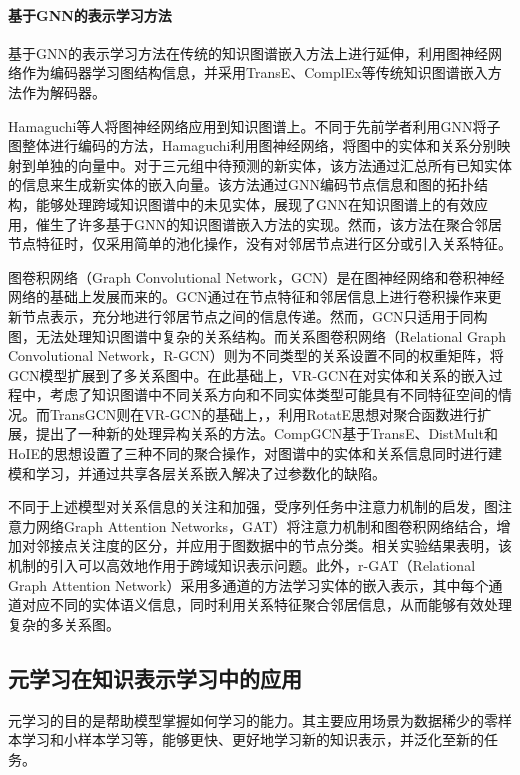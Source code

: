 \paragraph{基于GNN的表示学习方法}
基于GNN的表示学习方法在传统的知识图谱嵌入方法上进行延伸，利用图神经网络作为编码器学习图结构信息，并采用TransE、ComplEx等传统知识图谱嵌入方法作为解码器。

Hamaguchi\cite{hamaguchi2017knowledge}等人将图神经网络应用到知识图谱上。不同于先前学者利用GNN将子图整体进行编码的方法，Hamaguchi利用图神经网络，将图中的实体和关系分别映射到单独的向量中。对于三元组中待预测的新实体，该方法通过汇总所有已知实体的信息来生成新实体的嵌入向量。该方法通过GNN编码节点信息和图的拓扑结构，能够处理跨域知识图谱中的未见实体，展现了GNN在知识图谱上的有效应用，催生了许多基于GNN的知识图谱嵌入方法的实现。然而，该方法在聚合邻居节点特征时，仅采用简单的池化操作，没有对邻居节点进行区分或引入关系特征。

图卷积网络\cite{kipf2016semi}（Graph Convolutional Network，GCN）是在图神经网络和卷积神经网络的基础上发展而来的。GCN通过在节点特征和邻居信息上进行卷积操作来更新节点表示，充分地进行邻居节点之间的信息传递。然而，GCN只适用于同构图，无法处理知识图谱中复杂的关系结构。而关系图卷积网络\cite{schlichtkrull2018modeling}（Relational Graph Convolutional Network，R-GCN）则为不同类型的关系设置不同的权重矩阵，将GCN模型扩展到了多关系图中。在此基础上，VR-GCN\cite{ye2019vectorized}在对实体和关系的嵌入过程中，考虑了知识图谱中不同关系方向和不同实体类型可能具有不同特征空间的情况。而TransGCN\cite{cai2019transgcn}则在VR-GCN的基础上，，利用RotatE思想对聚合函数进行扩展，提出了一种新的处理异构关系的方法。CompGCN\cite{vashishth2019composition}基于TransE、DistMult和HoIE的思想设置了三种不同的聚合操作，对图谱中的实体和关系信息同时进行建模和学习，并通过共享各层关系嵌入解决了过参数化的缺陷。

不同于上述模型对关系信息的关注和加强，受序列任务中注意力机制的启发，图注意力网络\cite{nathani2019learning}Graph Attention Networks，GAT）将注意力机制和图卷积网络结合，增加对邻接点关注度的区分，并应用于图数据中的节点分类。相关实验结果表明，该机制的引入可以高效地作用于跨域知识表示问题。此外，r-GAT\cite{chen2021r}（Relational Graph Attention Network）采用多通道的方法学习实体的嵌入表示，其中每个通道对应不同的实体语义信息，同时利用关系特征聚合邻居信息，从而能够有效处理复杂的多关系图。

\subsection{元学习在知识表示学习中的应用}
元学习的目的是帮助模型掌握如何学习的能力。其主要应用场景为数据稀少的零样本学习和小样本学习等，能够更快、更好地学习新的知识表示，并泛化至新的任务。

